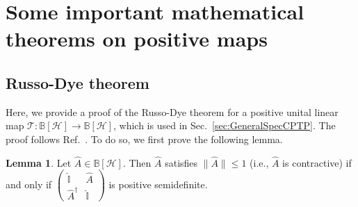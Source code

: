 \documentclass[preprint,pteplogo]{ptephy_v2}%
\numberwithin{equation}{section}
\theoremstyle{definition}
\newtheorem{lemma}[theorem]{Lemma}
\newcommand{\mc}[1]{\mathcal{#1}}
\newcommand{\mbb}[1]{\mathbb{#1}}
\begin{document}
\appendix

\section{Some important mathematical theorems on positive maps}

\subsection{Russo-Dye theorem}
\label{app:RussoDye}

Here, we provide a proof of the Russo-Dye theorem for a positive unital linear map $\mc{T}: \mbb{B}[\mc{H}] \to \mbb{B}[\mc{H}]$, which is used in Sec.~\ref{sec:GeneralSpecCPTP}. 
The proof follows Ref.~\cite{bhatia2007positive}.
To do so, we first prove the following lemma.
\begin{lemma}
Let $\hat{A} \in \mbb{B}[\mc{H}]$.
Then $\hat{A}$ satisfies $\lVert \hat{A} \rVert \leq 1$ (i.e., $\hat{A}$ is contractive) if and only if $\begin{pmatrix} \hat{\mbb{I}} & \hat{A} \\ \hat{A}^\dagger & \hat{\mbb{I}} \end{pmatrix}$ is positive semidefinite.
\end{lemma}
\end{document}
